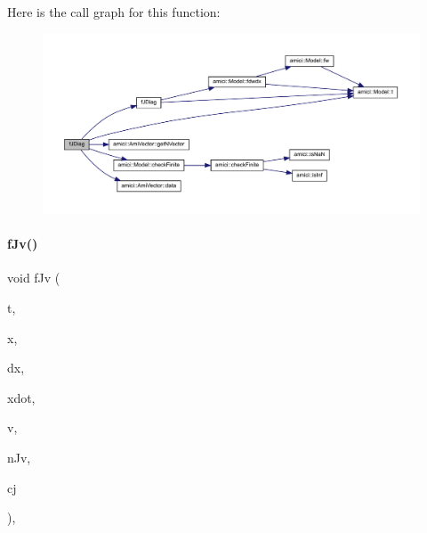 Here is the call graph for this function\+:
\nopagebreak
\begin{figure}[H]
\begin{center}
\leavevmode
\includegraphics[width=350pt]{classamici_1_1_model___o_d_e_a79269ef1a74e1ad9e313dce0e4220291_cgraph}
\end{center}
\end{figure}
\mbox{\label{classamici_1_1_model___o_d_e_a1a0549510cbe20e4d3c28bf77fc722ed}} 
\paragraph{\texorpdfstring{f\+Jv()}{fJv()}\hspace{0.1cm}{\footnotesize\ttfamily [1/3]}}
{\footnotesize\ttfamily void f\+Jv (\begin{DoxyParamCaption}\item[{\mbox{\hyperlink{namespaceamici_a1bdce28051d6a53868f7ccbf5f2c14a3}{realtype}}}]{t,  }\item[{\mbox{\hyperlink{classamici_1_1_ami_vector}{Ami\+Vector}} $\ast$}]{x,  }\item[{\mbox{\hyperlink{classamici_1_1_ami_vector}{Ami\+Vector}} $\ast$}]{dx,  }\item[{\mbox{\hyperlink{classamici_1_1_ami_vector}{Ami\+Vector}} $\ast$}]{xdot,  }\item[{\mbox{\hyperlink{classamici_1_1_ami_vector}{Ami\+Vector}} $\ast$}]{v,  }\item[{\mbox{\hyperlink{classamici_1_1_ami_vector}{Ami\+Vector}} $\ast$}]{n\+Jv,  }\item[{\mbox{\hyperlink{namespaceamici_a1bdce28051d6a53868f7ccbf5f2c14a3}{realtype}}}]{cj }\end{DoxyParamCaption})\hspace{0.3cm}{\ttfamily [override]}, {\ttfamily [virtual]}}

